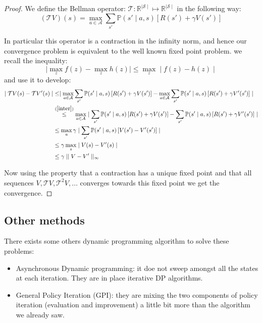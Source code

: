 \documentclass[14pt,a4paper]{article}
\theoremstyle{definition}
\begin{document}
\begin{proof} 
We define the Bellman operator: $\mathcal{T}:\mathbb{R}^{\mid \mathcal{S}\mid } \mapsto \mathbb{R}^{\mid \mathcal{S}\mid }$ in the following way:
\begin{equation*}
(\mathcal{T}V)(s)=\max_{a \in \mathcal{A}}\sum_{s'}\mathbb{P}(s'\mid a,s)\left[ R(s') + \gamma V(s') \right]
\end{equation*}

In particular this operator is a contraction in the infinity norm, and hence our convergence problem is equivalent to the well known fixed point problem. we recall the inequality: 
\begin{equation}
\mid \max_{z}f(z)-\max_{z}h(z)\mid \leq \max_{z}\mid f(z) - h(z)\mid
\label{inter}
\end{equation}
and use it to develop: 
\begin{equation*}
\begin{split}
\mid \mathcal{T}V(s) - \mathcal{T}V'(s) \mid & \leq \mid \max_{a \in \mathcal{A}}\sum_{s'}\mathbb{P}(s'\mid a,s)\left[ R(s') + \gamma V(s') \right] - \max_{a \in \mathcal{A}}\sum_{s'}\mathbb{P}(s'\mid a,s)\left[ R(s') + \gamma V'(s') \right]\mid
\\& \stackrel{(\ref{inter})}{\leq} \max_{a \in \mathcal{A}}\mid \sum_{s'}\mathbb{P}(s'\mid a,s)\left[ R(s') + \gamma V(s') \right] - \sum_{s'}\mathbb{P}(s'\mid a,s)\left[ R(s') + \gamma V'(s') \right]\mid
\\&\leq \max _{a}\gamma \mid \sum_{s'}\mathbb{P}(s'\mid a,s)\left[ V(s')-V'(s')\right] \mid
\\& \leq \gamma \max_{s} \mid V(s)-V'(s) \mid
\\& \leq \gamma \mid \mid V-V'\mid \mid _{\infty}
\end{split}
\end{equation*}

Now using the property that a contraction has a unique fixed point and that all sequences $V,\mathcal{T}V,\mathcal{T}^2V,\ldots $ converges towards this fixed point we get the convergence.


\end{proof}

\subsection{Other methods}



There exists some others dynamic programming algorithm to solve these problems: 
\begin{itemize}
\item Asynchronous Dynamic programming: it doe not sweep amongst all the states at each iteration. They are in place iterative DP algorithms.
\item General Policy Iteration (GPI): they are mixing the two components of policy iteration (evaluation and improvement) a little bit more than the algorithm we already saw.
\end{itemize}
\end{document}
